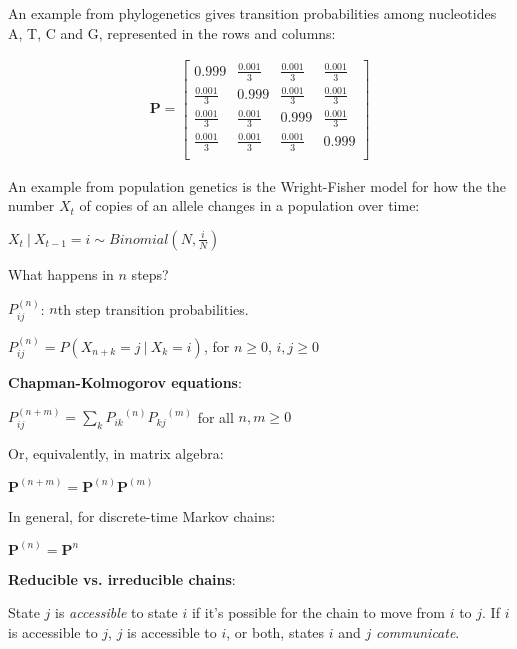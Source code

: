 \documentclass[12pt]{report}
\begin{document}
		
		\bigskip An example from phylogenetics gives transition probabilities among nucleotides A, T, C and G, represented in the rows and columns:
		
		\begin{center}
		\begin{align}
		\mathbf{P} =
		\begin{bmatrix}
			0.999 & \frac{0.001}{3} & \frac{0.001}{3} & \frac{0.001}{3} \\
			\frac{0.001}{3} & 0.999 & \frac{0.001}{3} & \frac{0.001}{3} \\
			\frac{0.001}{3} & \frac{0.001}{3} & 0.999 & \frac{0.001}{3} \\
			\frac{0.001}{3} & \frac{0.001}{3} & \frac{0.001}{3} & 0.999\\
		\end{bmatrix} \nonumber
		\end{align}
		\end{center}
		
		\bigskip An example from population genetics is the Wright-Fisher model for how the the number $X_t$ of copies of an allele changes in a population over time:
		
		\bigskip $X_t \ | \  X_{t-1} = i \sim Binomial (N, \frac{i}{N})$
		
		\bigskip
		\bigskip What happens in $n$ steps?
		
    		\bigskip ${P_{ij}^{(n)}}$: $n$th step transition probabilities.
		
		\bigskip ${P_{ij}^{(n)}} = P(X_{n+k} = j \ | \ X_k = i)$, for $n \ge 0$, $i, j \ge 0$
		
		\bigskip
		\bigskip\textbf{Chapman-Kolmogorov equations}:
		
		\bigskip ${P_{ij}^{(n+m)}} = \sum\limits_{k} {P_{ik}}^{(n)}{P_{kj}}^{(m)} $ for all $n, m \ge 0$

		\bigskip Or, equivalently, in matrix algebra:
		
		\bigskip$\mathbf{P}^{(n+m)} = \mathbf{P}^{(n)}\mathbf{P}^{(m)}$
		
		\bigskip In general, for discrete-time Markov chains:
		
		\bigskip $\mathbf{P}^{(n)} = \mathbf{P}^{n}$
		
		\bigskip
		\bigskip\textbf{Reducible vs. irreducible chains}:
		
		\bigskip State $j$ is \emph{accessible} to state $i$ if it's possible for the chain to move from $i$ to $j$. If $i$ is accessible to $j$, $j$ is accessible to $i$, or both, states $i$ and $j$ \emph{communicate}.
		
\end{document}
